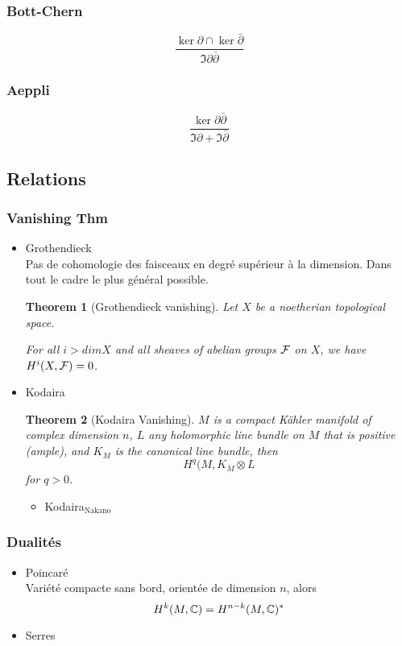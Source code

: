 \documentclass[12pt,makeidx]{amsart}
\newtheorem{theorem}{Theorem}
\begin{document}
\subsubsection{Bott-Chern}
\label{sec-1-3-4}

\[
\dfrac{\ker \partial \cap \ker \bar\partial}{\Im \partial\bar\partial}
\]
\subsubsection{Aeppli}
\label{sec-1-3-5}

\[
\dfrac{\ker \partial\bar\partial}{\Im \partial + \Im\bar\partial}
\]
\subsection{Relations}
\label{sec-1-4}
\subsubsection{Vanishing Thm}
\label{sec-1-4-1}
\begin{itemize}

\item Grothendieck\\
\label{sec-1-4-1-1}%
Pas de cohomologie des faisceaux en degré supérieur à la dimension. Dans tout le cadre le plus général possible.
\begin{theorem}[Grothendieck vanishing]
Let $X$ be a noetherian topological space.

For all $i > dim X$ and all sheaves of abelian groups $\mathcal{F}$ on $X$, we have $H^i(X, \mathcal{F} ) = 0$.
\end{theorem}

\item Kodaira
\label{sec-1-4-1-2}%
\begin{theorem}[Kodaira Vanishing]
$M$ is a compact Kähler manifold of complex dimension $n$, $L$ any holomorphic line bundle on $M$ that is positive (ample), and $K_M$ is the canonical line bundle, then
\[H^q(M,K_M \otimes L\]
for $q>0$.
\end{theorem}
\begin{itemize}

\item Kodaira$_{\mathrm{Nakano}}$
\label{sec-1-4-1-2-1}%
\end{itemize} %
\end{itemize} %
\subsubsection{Dualités}
\label{sec-1-4-2}
\begin{itemize}

\item Poincaré\\
\label{sec-1-4-2-1}%
Variété compacte sans bord, orientée de dimension $n$, alors
\[
H^k(M,\mathbb{C}) = H^{n-k}(M,\mathbb{C})^*
\]

\item Serres
\label{sec-1-4-2-2}%
\end{itemize} %
\end{document}

